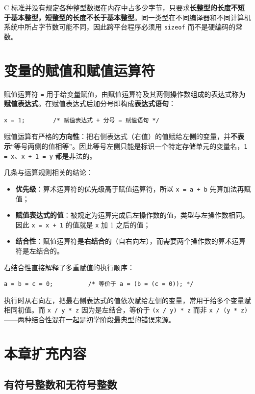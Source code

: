 C 标准并没有规定各种整型数据在内存中占多少字节，只要求\textbf{长整型的长度不短于基本整型，短整型的长度不长于基本整型}。同一类型在不同编译器和不同计算机系统中所占字节数可能不同，因此跨平台程序必须用 \texttt{sizeof} 而不是硬编码的常数。

\section{变量的赋值和赋值运算符}

赋值运算符 \texttt{=} 用于给变量赋值，由赋值运算符及其两侧操作数组成的表达式称为\textbf{赋值表达式}。在赋值表达式后加分号即构成\textbf{表达式语句}：

\begin{lstlisting}
x = 1;        /* 赋值表达式 + 分号 = 赋值语句 */
\end{lstlisting}

赋值运算有严格的\textbf{方向性}：把右侧表达式（右值）的值赋给左侧的变量，并\textbf{不表示}“等号两侧的值相等”。因此等号左侧只能是标识一个特定存储单元的变量名，\texttt{1 = x}、\texttt{x + 1 = y} 都是非法的。

几条与运算规则相关的结论：

\begin{itemize}
  \item \textbf{优先级}：算术运算符的优先级高于赋值运算符，所以 \texttt{x = a + b} 先算加法再赋值；
  \item \textbf{赋值表达式的值}：被规定为运算完成后左操作数的值，类型与左操作数相同。因此 \texttt{x = x + 1} 的值就是 \texttt{x} 加 1 之后的值；
  \item \textbf{结合性}：赋值运算符是\textbf{右结合}的（自右向左），而需要两个操作数的算术运算符是左结合的。
\end{itemize}

右结合性直接解释了多重赋值的执行顺序：

\begin{lstlisting}
a = b = c = 0;          /* 等价于 a = (b = (c = 0)); */
\end{lstlisting}
执行时从右向左，把最右侧表达式的值依次赋给左侧的变量，常用于给多个变量赋相同初值。而 \texttt{x / y * z} 因为是左结合，等价于 \texttt{(x / y) * z} 而非 \texttt{x / (y * z)}——两种结合性混在一起是初学阶段最典型的错误来源。

\section{本章扩充内容}

\subsection{有符号整数和无符号整数}

